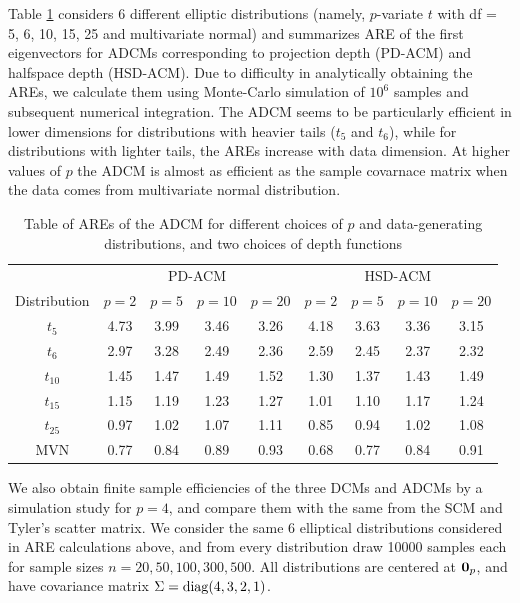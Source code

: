 Table \ref{table:AREtable} considers 6 different elliptic distributions (namely, $p$-variate $t$ with df = 5, 6, 10, 15, 25 and multivariate normal) and summarizes ARE of the first eigenvectors for ADCMs corresponding to projection depth (PD-ACM) and halfspace depth (HSD-ACM). Due to difficulty in analytically obtaining the AREs, we calculate them using Monte-Carlo simulation of $10^6$ samples and subsequent numerical integration. The ADCM seems to be particularly efficient in lower dimensions for distributions with heavier tails ($t_5$ and $t_6$), while for distributions with lighter tails, the AREs increase with data dimension. At higher values of $p$ the ADCM is almost as efficient as the sample covarnace matrix when the data comes from multivariate normal distribution.

\begin{table}[t]
\centering
\begin{footnotesize}
\begin{tabular}{c|cccc|cccc}
    \hline
    & \multicolumn{4}{c|}{PD-ACM} & \multicolumn{4}{c}{HSD-ACM} \\\cline{2-9}
    Distribution & $p=2$  & $p=5$  & $p=10$ & $p=20$ & $p=2$  & $p=5$  & $p=10$ & $p=20$ \\ \hline
    $t_5$           & 4.73 & 3.99 & 3.46 & 3.26 & 4.18 & 3.63 & 3.36 & 3.15 \\
    $t_6$           & 2.97 & 3.28 & 2.49 & 2.36 & 2.59 & 2.45 & 2.37 & 2.32 \\
    $t_{10}$          & 1.45 & 1.47 & 1.49 & 1.52 & 1.30 & 1.37 & 1.43 & 1.49 \\
    $t_{15}$          & 1.15 & 1.19 & 1.23 & 1.27 & 1.01 & 1.10 & 1.17 & 1.24 \\
    $t_{25}$          & 0.97 & 1.02 & 1.07 & 1.11 & 0.85 & 0.94 & 1.02 & 1.08 \\
    MVN          & 0.77 & 0.84 & 0.89 & 0.93 & 0.68 & 0.77 & 0.84 & 0.91 \\ \hline
\end{tabular}
\end{footnotesize}
\caption{Table of AREs of the ADCM for different choices of $p$ and data-generating distributions, and two choices of depth functions}
\label{table:AREtable}
\end{table}

We also obtain finite sample efficiencies of the three DCMs and ADCMs by a simulation study for $p=4$, and compare them with the same from the SCM and Tyler's scatter matrix. We consider the same 6 elliptical distributions considered in ARE calculations above, and from every distribution draw 10000 samples each for sample sizes $n = 20, 50, 100, 300, 500$. All distributions are centered at ${\bf 0}_p$, and have covariance matrix $\Sigma = \operatorname*{diag}(4,3,2,1)$.

